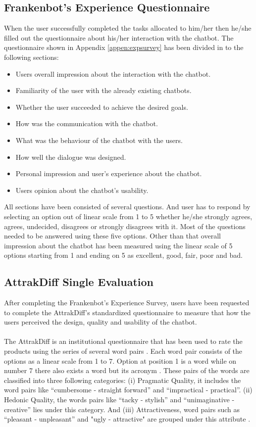 \subsection{Frankenbot's Experience Questionnaire}
When the user successfully completed the tasks allocated to him/her then he/she filled out the questionnaire about his/her interaction with the chatbot. The questionnaire shown in Appendix \ref{appen:expsurvey} has been divided in to the following sections:
\begin{itemize}
    \item Users overall impression about the interaction with the chatbot.
    \item Familiarity of the user with the already existing chatbots.
    \item Whether the user succeeded to achieve the desired goals.
    \item How was the communication with the chatbot.
    \item What was the behaviour of the chatbot with the users.
    \item How well the dialogue was designed.
    \item Personal impression and user's experience about the chatbot.
    \item Users opinion about the chatbot's usability. 
\end{itemize} 
All sections have been consisted of several questions. And user has to respond by selecting an option out of linear scale from 1 to 5 whether he/she strongly agrees, agrees, undecided, disagrees or strongly disagrees with it. Most of the questions needed to be answered using these five options. Other than that overall impression about the chatbot has been measured using the linear scale of 5 options starting from 1 and ending on 5 as excellent, good, fair, poor and bad.

\subsection{AttrakDiff Single Evaluation}
After completing the Frankenbot's Experience Survey, users have been requested to complete the AttrakDiff's standardized questionnaire to measure that how the users perceived the design, quality and usability of the chatbot.
\\~\\
The AttrakDiff is an institutional questionnaire that has been used to rate the products using the series of several word pairs \cite{alex}. Each word pair consists of the options as a linear scale from 1 to 7. Option at position 1 is a word while on number 7 there also exists a word but its acronym \cite{attrakdiffQuest}. These pairs of the words are classified into three following categories: (i) Pragmatic Quality, it includes the word pairs like “cumbersome - straight forward” and “impractical - practical”. (ii) Hedonic Quality, the words pairs like “tacky - stylish” and “unimaginative - creative” lies under this category. And (iii) Attractiveness, word pairs such as “pleasant - unpleasant” and "ugly - attractive" are grouped under this attribute \cite{alex}.

